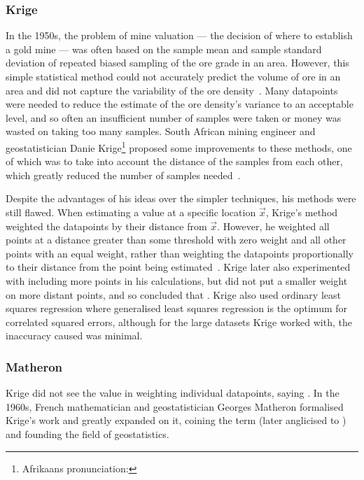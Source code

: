 \subsubsection{Krige}

In the 1950s, the problem of mine valuation --- the decision of where to establish a gold mine --- was often based on the sample mean and sample standard deviation of repeated biased sampling of the ore grade in an area.
However, this simple statistical method could not accurately predict the volume of ore in an area and did not capture the variability of the ore density~\autocites[244]{cressie1990}[119]{krige1951}.
Many datapoints were needed to reduce the estimate of the ore density's variance to an acceptable level, and so often an insufficient number of samples were taken or money was wasted on taking too many samples.
South African mining engineer and geostatistician Danie Krige\footnote{Afrikaans pronunciation: } proposed some improvements to these methods, one of which was to take into account the distance of the samples from each other, which greatly reduced the number of samples needed~\autocite{krige1951}.

Despite the advantages of his ideas over the simpler techniques, his methods were still flawed.
When estimating a value at a specific location \(\vec{x}\), Krige's method weighted the datapoints by their distance from \(\vec{x}\).
However, he weighted all points at a distance greater than some threshold with zero weight and all other points with an equal weight, rather than weighting the datapoints proportionally to their distance from the point being estimated~\autocite[245]{cressie1990}.
Krige later also experimented with including more points in his calculations, but did not put a smaller weight on more distant points, and so concluded that .
Krige also used ordinary least squares regression where generalised least squares regression is the optimum for correlated squared errors, although for the large datasets Krige worked with, the inaccuracy caused was minimal.

\subsubsection{Matheron}

Krige did not see the value in weighting individual datapoints, saying .
In the 1960s, French mathematician and geostatistician Georges Matheron formalised Krige's work and greatly expanded on it, coining the term  (later anglicised to )~\autocite{matheron1960} and founding the field of geostatistics.

